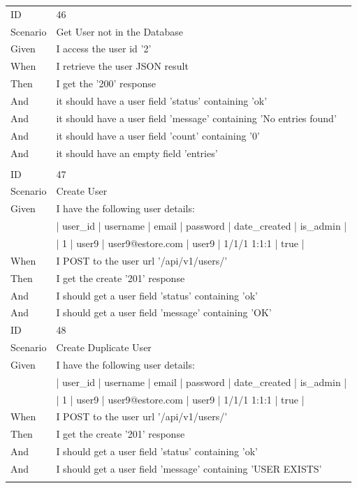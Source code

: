 \documentclass{report}
\begin{document}
\begin{tabular}{ l l }
ID 			& 46\\
Scenario		& Get User not in the Database \\
Given 		& I access the user id '2' \\
When 		& I retrieve the user JSON result \\
Then 		& I get the '200' response \\
And 			& it should have a user field 'status' containing 'ok' \\
And 			& it should have a user field 'message' containing 'No entries found' \\
And 			& it should have a user field 'count' containing '0' \\
And 			& it should have an empty field 'entries'\\ \\
ID 			& 47\\
Scenario		& Create User \\
Given 		& I have the following user details: \\
      		& | user\_id | username | email            | password | date\_created | is\_admin | \\
      		& | 1       | user9    | user9@estore.com | user9    | 1/1/1 1:1:1  | true     | \\
When 		& I POST to the user url '/api/v1/users/' \\
Then 		& I get the create '201' response \\
And 			& I should get a user field 'status' containing 'ok' \\
And 			& I should get a user field 'message' containing 'OK' \\
ID 			& 48\\
Scenario		& Create Duplicate User \\
Given 		& I have the following user details: \\ 
      		& | user\_id | username | email            | password | date\_created | is\_admin | \\
      		& | 1       | user9    | user9@estore.com | user9    | 1/1/1 1:1:1  | true     | \\
When 		& I POST to the user url '/api/v1/users/' \\
Then 		& I get the create '201' response \\
And 			& I should get a user field 'status' containing 'ok' \\
And 			& I should get a user field 'message' containing 'USER EXISTS' \\ \\

\end{tabular}
\end{document}
